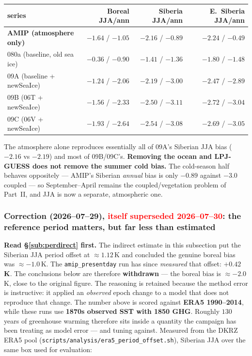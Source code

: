 \documentclass[10pt]{article}
\begin{document}
\begin{center}\small
\begin{tabular}{l r r r}
\toprule
series & Boreal JJA/ann & Siberia JJA/ann & E.\ Siberia JJA/ann \\
\midrule
\textbf{AMIP (atmosphere only)} & $-1.64$ / $-1.05$ & $\mathbf{-2.16}$ / $-0.89$ & $\mathbf{-2.24}$ / $-0.49$ \\
080a (baseline, old sea ice)    & $-0.36$ / $-0.90$ & $-1.41$ / $-1.36$ & $-1.80$ / $-1.48$ \\
09A (baseline + newSeaIce)      & $-1.24$ / $-2.06$ & $-2.19$ / $-3.00$ & $-2.47$ / $-2.89$ \\
09B (06T + newSeaIce)           & $-1.56$ / $-2.33$ & $-2.50$ / $-3.11$ & $-2.72$ / $-3.04$ \\
09C (06V + newSeaIce)           & $-1.93$ / $-2.64$ & $-2.54$ / $-3.08$ & $-2.69$ / $-3.05$ \\
\bottomrule
\end{tabular}
\end{center}

The atmosphere alone reproduces essentially all of 09A's Siberian JJA bias ($-2.16$ vs $-2.19$) and most of
09B/09C's. \textbf{Removing the ocean and LPJ-GUESS does not remove the summer cold bias.} The cold-season
half behaves oppositely --- AMIP's Siberian \emph{annual} bias is only $-0.89$ against $-3.0$ coupled --- so
September--April remains the coupled/vegetation problem of Part~II, and JJA is now a separate, atmospheric one.

\subsubsection{Correction (2026--07--29), \textcolor{red}{itself superseded 2026--07--30}: the reference period matters, but far less than estimated}\label{sub:perioffset}
\textbf{Read \S\ref{sub:perdirect} first.} The indirect estimate in this subsection put the Siberian JJA period offset at $\approx1.12$\,K and concluded the genuine boreal bias was $\approx-1.0$\,K. The \texttt{amip\_presentday} run has since \emph{measured} that offset: $\mathbf{+0.42}$\,\textbf{K}. The conclusions below are therefore \textbf{withdrawn} --- the boreal bias is $\approx-2.0$\,K, close to the original figure. The reasoning is retained because the method error is instructive: it applied an \emph{observed} epoch change to a model that does not reproduce that change.
The number above is scored against \textbf{ERA5 1990--2014}, while these runs use \textbf{1870s observed SST
with 1850 GHG}. Roughly $130$ years of greenhouse warming therefore sits inside a quantity the campaign has
been treating as model error --- and tuning against. Measured from the DKRZ ERA5 pool
(\texttt{scripts/analysis/era5\_period\_offset.sh}), Siberian JJA over the same box used for evaluation:
\end{document}
